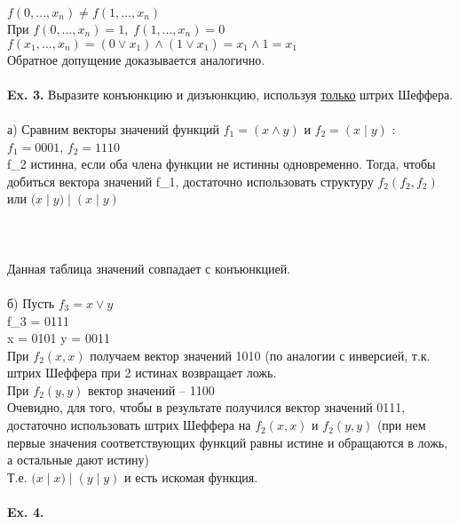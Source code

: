 $ f(0, ... , x_n) \neq f(1, ... , x_n) $
\\
При $ f(0, ... , x_n) = 1,\; f(1, ... , x_n) = 0 $
\\
$ f(x_1, ... , x_n) = (0 \vee x_1) \wedge (1 \vee x_1) = x_1 \wedge 1 = x_1 $
\\
Обратное допущение доказывается аналогично.
\\
\\
\textbf{Ex. 3.} Выразите конъюнкцию и дизъюнкцию, используя \underline{только} штрих Шеффера.
\\
\\
а) Сравним векторы значений функций $ f_1 = ( x \wedge y) $ и $ f_2 = (x \; | \; y) $ :
\\
$ f_1 = 0001 $, $ f_2 = 1110$
\\
f_2 истинна, если оба члена функции не истинны одновременно. Тогда, чтобы добиться вектора значений f_1, достаточно использовать структуру $ f_2( f_2, f_2) $ или $ (x  \; | \; y) \; | \; (x \; | \; y) $
\\
\\
\\
\\
Данная таблица значений совпадает с конъюнкцией.
\\
\\
б) Пусть $ f_3 = x \vee y $
\\
f_3 = 0111
\\
x = 0101
y = 0011
\\
При $ f_2 (x, x) $ получаем вектор значений 1010 (по аналогии с инверсией, т.к. штрих Шеффера при 2 истинах возвращает ложь.
\\
При $ f_2 (y, y) $ вектор значений -- 1100
\\
Очевидно, для того, чтобы в результате получился вектор значений 0111, достаточно использовать штрих Шеффера на $ f_2 (x, x) $ и $ f_2 (y, y) $ (при нем первые значения соответствующих функций равны истине и обращаются в ложь, а остальные дают истину)
\\
Т.е. $(x \; | \; x) \; | \; (y \; | \; y)$ и есть искомая функция.
\\
\\
\textbf{Ex. 4.} 